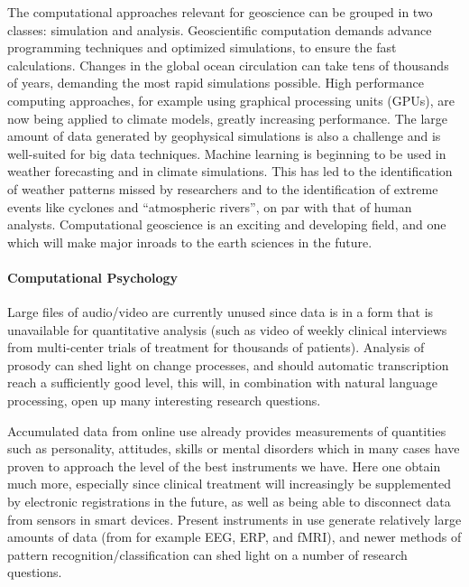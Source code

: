 \documentclass[]{article}
\let\oldparagraph\paragraph
\renewcommand{\paragraph}[1]{\oldparagraph{#1}\mbox{}}
\begin{document}
The computational approaches relevant for geoscience can be grouped in
two classes: simulation and analysis. Geoscientific computation demands
advance programming techniques and optimized simulations, to ensure the
fast calculations. Changes in the global ocean circulation can take tens
of thousands of years, demanding the most rapid simulations possible.
High performance computing approaches, for example using graphical
processing units (GPUs), are now being applied to climate models,
greatly increasing performance. The large amount of data generated by
geophysical simulations is also a challenge and is well-suited for big
data techniques. Machine learning is beginning to be used in weather
forecasting and in climate simulations. This has led to the
identification of weather patterns missed by researchers and to the
identification of extreme events like cyclones and ``atmospheric
rivers'', on par with that of human analysts. Computational geoscience
is an exciting and developing field, and one which will make major
inroads to the earth sciences in the future.

\hypertarget{computational-psychology}{%
\paragraph{Computational Psychology}\label{computational-psychology}}

Large files of audio/video are currently unused since data is in a form
that is unavailable for quantitative analysis (such as video of weekly
clinical interviews from multi-center trials of treatment for thousands
of patients). Analysis of prosody can shed light on change processes,
and should automatic transcription reach a sufficiently good level, this
will, in combination with natural language processing, open up many
interesting research questions.

Accumulated data from online use already provides measurements of
quantities such as personality, attitudes, skills or mental disorders
which in many cases have proven to approach the level of the best
instruments we have. Here one obtain much more, especially since
clinical treatment will increasingly be supplemented by electronic
registrations in the future, as well as being able to disconnect data
from sensors in smart devices. Present instruments in use generate
relatively large amounts of data (from for example EEG, ERP, and fMRI),
and newer methods of pattern recognition/classification can shed light
on a number of research questions.
\end{document}
